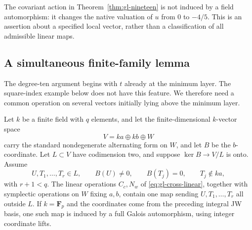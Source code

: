 The covariant action in Theorem~\ref{thm:gl-nineteen} is not induced
by a field automorphism: it changes the native valuation of $u$
from $0$ to $-4/5$. This is an assertion about a specified local
vector, rather than a classification of all admissible linear maps.

\subsection{A simultaneous finite-family lemma}

The degree-ten argument begins with $t$ already at the minimum
layer. The square-index example below does not have this feature.
We therefore need a common operation on several vectors initially
lying above the minimum layer.

\begin{lemma}
\label{lem:gl-finite-family}
Let $k$ be a finite field with $q$ elements, and let the finite-dimensional
$k$-vector space
\[
 V=ka\oplus kb\oplus W
\]
carry the standard nondegenerate alternating form on $W$, and let
$B$ be the $b$-coordinate. Let $L\subset V$ have codimension two,
and suppose $\ker B\to V/L$ is onto. Assume
\[
 U,T_1,\ldots,T_r\in L,\qquad B(U)\ne0,\qquad B(T_j)=0,
 \qquad T_j\notin ka,
\]
with $r+1<q$. The linear operations $C_c,N_w$ of
\eqref{eq:gl-cross-linear}, together with symplectic operations
on $W$ fixing $a,b$, contain one map sending
$U,T_1,\ldots,T_r$ all outside $L$.
If $k=\mathbf F_p$ and the coordinates come from the preceding
integral JW basis, one such map is induced by a full Galois
automorphism, using integer coordinate lifts.
\end{lemma}

